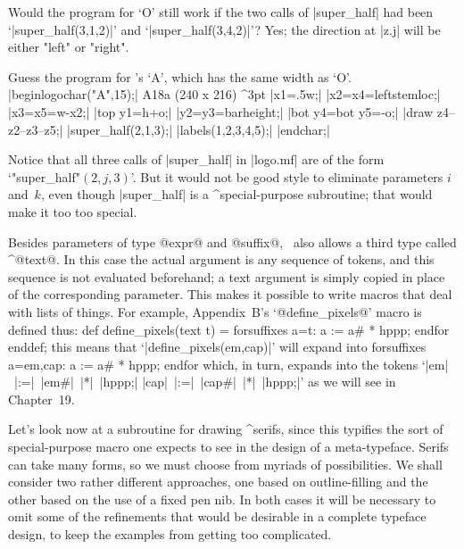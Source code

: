 {{{{\exercise Would the program for `{\manual O}' still work if the two calls of
|super_half| had been `|super_half(3,1,2)|' and `|super_half(3,4,2)|'\thinspace?
\answer Yes; the direction at |z.j| will be either "left" or "right".

\exercise Guess the program for \MF's `{\manual A}', which has the
same width as `{\manual O}'.
\answer |beginlogochar("A",15);|
\rightfig A18a ({240\apspix} x {216\apspix}) ^3pt \parbreak
|x1=.5w;|\parbreak
|x2=x4=leftstemloc;|\parbreak
|x3=x5=w-x2;|\parbreak
|top y1=h+o;|\parbreak
|y2=y3=barheight;|\parbreak
|bot y4=bot y5=-o;|\parbreak
|draw z4--z2--z3--z5;|\parbreak
|super_half(2,1,3);|\parbreak
|labels(1,2,3,4,5);|\parbreak
|endchar;|\par\smallskip\noindent
Notice that all three calls of |super_half| in |logo.mf| are of the form
`"super\_half"$(2,j,3)$'. But it would not be good style to eliminate
parameters $i$ and~$k$, even though |super_half| is a ^{special-purpose}
subroutine; that would make it too too special.

\danger Besides parameters of type @expr@ and @suffix@, \MF\ also
allows a third type called ^@text@. In this case the actual argument
is any sequence of tokens, and this sequence is not evaluated
beforehand; a text argument is simply copied in place of the
corresponding parameter. This makes it possible to write macros that
deal with lists of things. For example, Appendix~B's `@define\_pixels@'
macro is defined thus:
\begintt
def define_pixels(text t) =
 forsuffixes a=t: a := a# * hppp; endfor enddef;
\endtt
this means that `|define_pixels(em,cap)|' will expand into
\begintt
forsuffixes a=em,cap: a := a# * hppp; endfor
\endtt
which, in turn, expands into the tokens `|em|~|:=|~|em#|~|*|~|hppp;|
|cap|~|:=|~|cap#|~|*|~|hppp;|' as we will see in Chapter~19.

\danger Let's look now at a subroutine for drawing ^{serifs}, since
this typifies the sort of special-purpose macro one expects to see
in the design of a meta-typeface. Serifs can take many forms,
so we must choose from myriads of possibilities. We shall consider
two rather different approaches, one based on outline-filling and the
other based on the use of a fixed pen nib. In both cases it will be
necessary to omit some of the refinements that would be desirable
in a complete typeface design, to keep the examples from
getting too complicated.

}}}}
